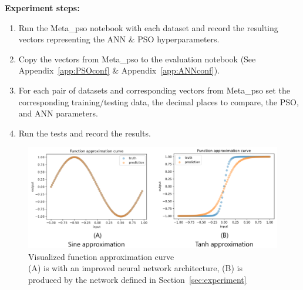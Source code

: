 \documentclass[12pt]{article}
\begin{document}
\noindent\textbf{Experiment steps:}
\begin{enumerate}
    \item Run the Meta\_pso notebook with each dataset and record the resulting vectors representing the ANN \& PSO hyperparameters.
    \item Copy the vectors from Meta\_pso to the evaluation notebook (See Appendix~\ref{app:PSOconf} \& Appendix~\ref{app:ANNconf}).
    \item For each pair of datasets and corresponding vectors from Meta\_pso set the corresponding training/testing data, the decimal places to compare, the PSO, and ANN parameters.
    \item Run the tests and record the results.
\end{enumerate}

\begin{figure}[H]
    \begin{center}
        \includegraphics[width=1\textwidth]{approximation_curve_plot.png} 
    \end{center}
    \caption{Visualized function approximation curve\\
    (A) is with an improved neural network architecture, (B) is produced by the network defined in Section~\ref{sec:experiment} }
    \label{fig:approximationCurve}   
\end{figure}

\clearpage
\end{document}
